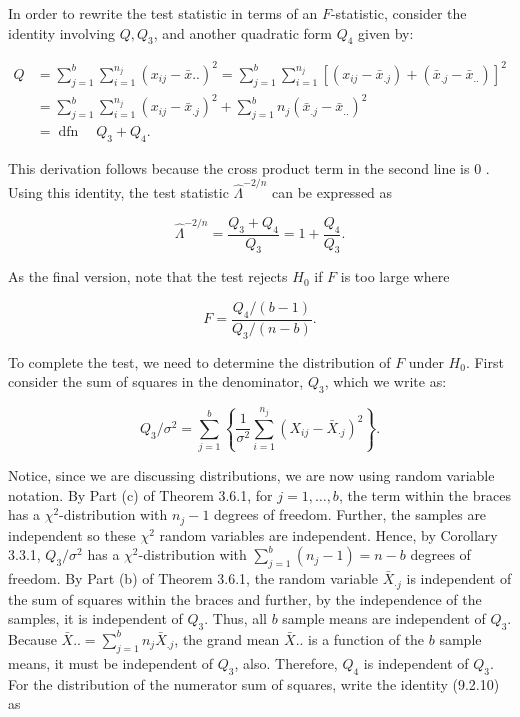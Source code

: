 In order to rewrite the test statistic in terms of an $F$-statistic, consider the identity involving $Q, Q_{3}$, and another quadratic form $Q_{4}$ given by:


\begin{align*}
Q & =\sum_{j=1}^{b} \sum_{i=1}^{n_{j}}\left(x_{i j}-\bar{x} . .\right)^{2}=\sum_{j=1}^{b} \sum_{i=1}^{n_{j}}\left[\left(x_{i j}-\bar{x}_{. j}\right)+\left(\bar{x}_{. j}-\bar{x}_{. .}\right)\right]^{2} \\
& =\sum_{j=1}^{b} \sum_{i=1}^{n_{j}}\left(x_{i j}-\bar{x}_{. j}\right)^{2}+\sum_{j=1}^{b} n_{j}\left(\bar{x}_{. j}-\bar{x}_{. .}\right)^{2} \\
& =\operatorname{dfn} \quad Q_{3}+Q_{4} . \tag{9.2.10}
\end{align*}


This derivation follows because the cross product term in the second line is 0 . Using this identity, the test statistic $\hat{\Lambda}^{-2 / n}$ can be expressed as

$$
\hat{\Lambda}^{-2 / n}=\frac{Q_{3}+Q_{4}}{Q_{3}}=1+\frac{Q_{4}}{Q_{3}} .
$$

As the final version, note that the test rejects $H_{0}$ if $F$ is too large where


\begin{equation*}
F=\frac{Q_{4} /(b-1)}{Q_{3} /(n-b)} . \tag{9.2.11}
\end{equation*}


To complete the test, we need to determine the distribution of $F$ under $H_{0}$. First consider the sum of squares in the denominator, $Q_{3}$, which we write as:

$$
Q_{3} / \sigma^{2}=\sum_{j=1}^{b}\left\{\frac{1}{\sigma^{2}} \sum_{i=1}^{n_{j}}\left(X_{i j}-\bar{X}_{\cdot j}\right)^{2}\right\} .
$$

Notice, since we are discussing distributions, we are now using random variable notation. By Part (c) of Theorem 3.6.1, for $j=1, \ldots, b$, the term within the braces has a $\chi^{2}$-distribution with $n_{j}-1$ degrees of freedom. Further, the samples are independent so these $\chi^{2}$ random variables are independent. Hence, by Corollary 3.3.1, $Q_{3} / \sigma^{2}$ has a $\chi^{2}$-distribution with $\sum_{j=1}^{b}\left(n_{j}-1\right)=n-b$ degrees of freedom. By Part (b) of Theorem 3.6.1, the random variable $\bar{X}_{\cdot j}$ is independent of the sum of squares within the braces and further, by the independence of the samples, it is independent of $Q_{3}$. Thus, all $b$ sample means are independent of $Q_{3}$. Because $\bar{X} . .=\sum_{j=1}^{b} n_{j} \bar{X}_{. j}$, the grand mean $\bar{X} .$. is a function of the $b$ sample means, it must be independent of $Q_{3}$, also. Therefore, $Q_{4}$ is independent of $Q_{3}$. For the distribution of the numerator sum of squares, write the identity (9.2.10) as

